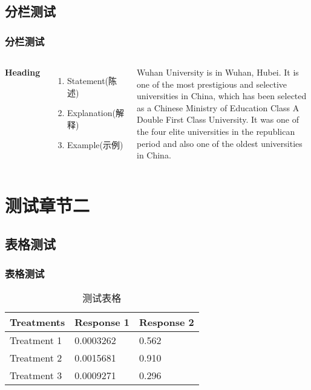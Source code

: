 \documentclass[presentation,aspectratio=1610]{beamer}
\begin{document}

\subsection{分栏测试}

\begin{frame}
\frametitle{分栏测试}
\begin{columns}[c] %

\textbf{Heading}
\begin{enumerate}
\item Statement(陈述)
\item Explanation(解释)
\item Example(示例)
\end{enumerate}

Wuhan University is in Wuhan, Hubei.
It is one of the most prestigious and selective universities in China, which has been selected as a Chinese Ministry of Education Class A Double First Class University.
It was one of the four elite universities in the republican period and also one of the oldest universities in China.

\end{columns}
\end{frame}


\section{测试章节二}
\subsection{表格测试}

\begin{frame}
\frametitle{表格测试}
\begin{table}
\begin{tabular}{l l l}
\toprule
\textbf{Treatments} & \textbf{Response 1} & \textbf{Response 2}\\
\midrule
Treatment 1 & 0.0003262 & 0.562 \\
Treatment 2 & 0.0015681 & 0.910 \\
Treatment 3 & 0.0009271 & 0.296 \\
\bottomrule
\end{tabular}
\caption{测试表格}
\end{table}
\end{frame}
\end{document}
